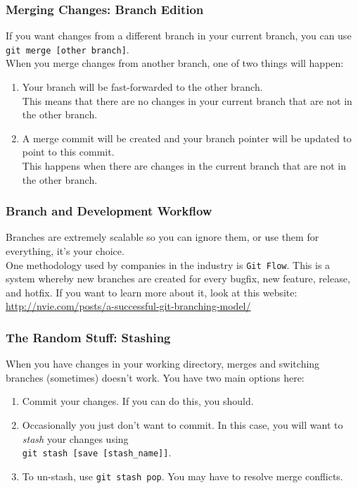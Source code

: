 \documentclass{beeper}
\begin{document}
\begin{frame}
    \frametitle{Merging Changes: Branch Edition}
    If you want changes from a different branch in your current branch, you can use \texttt{git
    merge [other branch]}.\\

    When you merge changes from another branch, one of two things will happen\footnotemark:

    \begin{enumerate}
        \item Your branch will be fast-forwarded to the other branch.\\
            This means that there are no changes in your current branch that are not in the other
            branch.
        \item A merge commit will be created and your branch pointer will be updated to point to
            this commit.\\
            This happens when there are changes in the current branch that are not in the other
            branch.
    \end{enumerate}

\end{frame}

\begin{frame}
    \frametitle{Branch and Development Workflow}

    Branches are extremely scalable so you can ignore them, or use them for everything, it's your
    choice.\\

    One methodology used by companies in the industry is \texttt{Git Flow}. This is a system
    whereby new branches are created for every bugfix, new feature, release, and hotfix. If you want
    to learn more about it, look at this website:
    \url{http://nvie.com/posts/a-successful-git-branching-model/}
\end{frame}

\begin{frame}
    \frametitle{The Random Stuff: Stashing}

    When you have changes in your working directory, merges and switching branches (sometimes)
    doesn't work. You have two main options here:

    \begin{enumerate}
        \item Commit your changes. If you can do this, you should.
        \item Occasionally you just don't want to commit. In this case, you will want to
            \textit{stash} your changes using\\ \texttt{git stash [save [stash\_name]]}.
        \item To un-stash, use \texttt{git stash pop}. You may have to resolve merge conflicts.
    \end{enumerate}
\end{frame}
\end{document}
